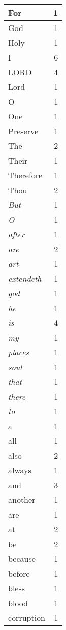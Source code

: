 \begin{center}
\begin{longtable}{l|r}
\hline \hline
\endlastfoot
For & 1 \\ \hline
God & 1 \\ \hline
Holy & 1 \\ \hline
I & 6 \\ \hline
LORD & 4 \\ \hline
Lord & 1 \\ \hline
O & 1 \\ \hline
One & 1 \\ \hline
Preserve & 1 \\ \hline
The & 2 \\ \hline
Their & 1 \\ \hline
Therefore & 1 \\ \hline
Thou & 2 \\ \hline
\emph{But} & 1 \\ \hline
\emph{O} & 1 \\ \hline
\emph{after} & 1 \\ \hline
\emph{are} & 2 \\ \hline
\emph{art} & 1 \\ \hline
\emph{extendeth} & 1 \\ \hline
\emph{god} & 1 \\ \hline
\emph{he} & 1 \\ \hline
\emph{is} & 4 \\ \hline
\emph{my} & 1 \\ \hline
\emph{places} & 1 \\ \hline
\emph{soul} & 1 \\ \hline
\emph{that} & 1 \\ \hline
\emph{there} & 1 \\ \hline
\emph{to} & 1 \\ \hline
a & 1 \\ \hline
all & 1 \\ \hline
also & 2 \\ \hline
always & 1 \\ \hline
and & 3 \\ \hline
another & 1 \\ \hline
are & 1 \\ \hline
at & 2 \\ \hline
be & 2 \\ \hline
because & 1 \\ \hline
before & 1 \\ \hline
bless & 1 \\ \hline
blood & 1 \\ \hline
corruption & 1 \\ \hline

\end{longtable}
\end{center}
